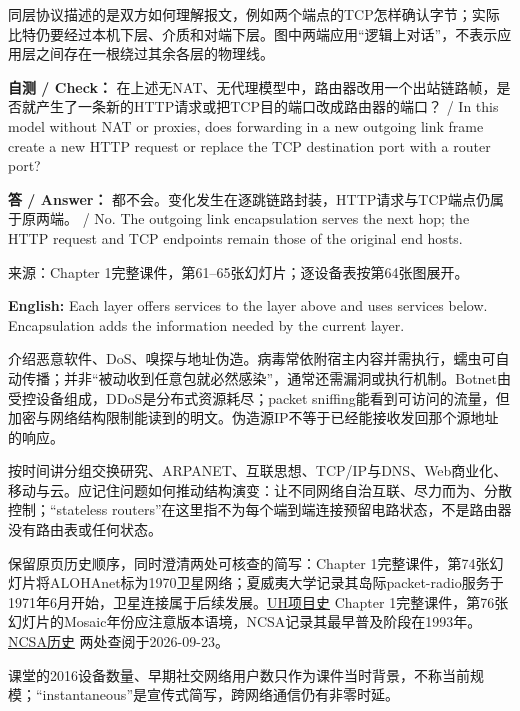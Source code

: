 同层协议描述的是双方如何理解报文，例如两个端点的TCP怎样确认字节；实际比特仍要经过本机下层、介质和对端下层。图中两端应用“逻辑上对话”，不表示应用层之间存在一根绕过其余各层的物理线。


\textbf{自测 / Check：} 在上述无NAT、无代理模型中，路由器改用一个出站链路帧，是否就产生了一条新的HTTP请求或把TCP目的端口改成路由器的端口？ / In this model without NAT or proxies, does forwarding in a new outgoing link frame create a new HTTP request or replace the TCP destination port with a router port?


\textbf{答 / Answer：} 都不会。变化发生在逐跳链路封装，HTTP请求与TCP端点仍属于原两端。 / No. The outgoing link encapsulation serves the next hop; the HTTP request and TCP endpoints remain those of the original end hosts.


来源：Chapter 1完整课件，第61–65张幻灯片；逐设备表按第64张图展开。


\textbf{English:} Each layer offers services to the layer above and uses services below. Encapsulation adds the information needed by the current layer.





介绍恶意软件、DoS、嗅探与地址伪造。病毒常依附宿主内容并需执行，蠕虫可自动传播；并非“被动收到任意包就必然感染”，通常还需漏洞或执行机制。Botnet由受控设备组成，DDoS是分布式资源耗尽；packet sniffing能看到可访问的流量，但加密与网络结构限制能读到的明文。伪造源IP不等于已经能接收发回那个源地址的响应。


按时间讲分组交换研究、ARPANET、互联思想、TCP/IP与DNS、Web商业化、移动与云。应记住问题如何推动结构演变：让不同网络自治互联、尽力而为、分散控制；“stateless routers”在这里指不为每个端到端连接预留电路状态，不是路由器没有路由表或任何状态。


保留原页历史顺序，同时澄清两处可核查的简写：Chapter 1完整课件，第74张幻灯片将ALOHAnet标为1970卫星网络；夏威夷大学记录其岛际packet-radio服务于1971年6月开始，卫星连接属于后续发展。\href{https://manoa.hawaii.edu/engineering/about-us/history/alohanet.php}{UH项目史} Chapter 1完整课件，第76张幻灯片的Mosaic年份应注意版本语境，NCSA记录其最早普及阶段在1993年。\href{https://www.ncsa.illinois.edu/about/history/}{NCSA历史} 两处查阅于2026-09-23。


课堂的2016设备数量、早期社交网络用户数只作为课件当时背景，不称当前规模；“instantaneous”是宣传式简写，跨网络通信仍有非零时延。


